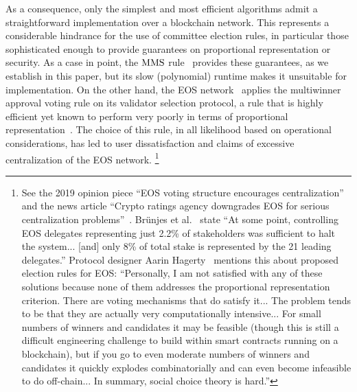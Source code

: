 As a consequence, only the simplest and most efficient algorithms admit a straightforward implementation over a blockchain network. This represents a considerable hindrance for the use of committee election rules, in particular those sophisticated enough to provide guarantees on proportional representation or security. As a case in point, the $\operatorname{MMS}$ rule~\cite{sanchez2016maximin} provides these guarantees, as we establish in this paper, but its slow (polynomial) runtime makes it unsuitable for implementation. On the other hand, the EOS network~\cite{griggeos} applies the multiwinner approval voting rule on its validator selection protocol, a rule that is highly efficient yet known to perform very poorly in terms of proportional representation~\cite[Table 2]{lackner2020approval}. 
The choice of this rule, in all likelihood based on operational considerations, has led to user dissatisfaction and claims of excessive centralization of the EOS network.%
%
\footnote{See the 2019 opinion piece ``EOS voting structure encourages centralization''~\cite{garg} and the news article ``Crypto ratings agency downgrades EOS for serious centralization problems''~\cite{chong}. 
Br{\"u}njes et al.~\cite{brunjes2020reward} state ``At some point, controlling EOS delegates representing just 2.2\% of stakeholders was sufficient to halt the system... [and] only 8\% of total stake is represented by the 21 leading delegates.'' 
Protocol designer Aarin Hagerty~\cite{hagerty} mentions this about proposed election rules for EOS: ``Personally, I am not satisfied with any of these solutions because none of them addresses the proportional representation criterion. There are voting mechanisms that do satisfy it... The problem tends to be that they are actually very computationally intensive... For small numbers of winners and candidates it may be feasible (though this is still a difficult engineering challenge to build within smart contracts running on a blockchain), but if you go to even moderate numbers of winners and candidates it quickly explodes combinatorially and can even become infeasible to do off-chain... In summary, social choice theory is hard.''}

